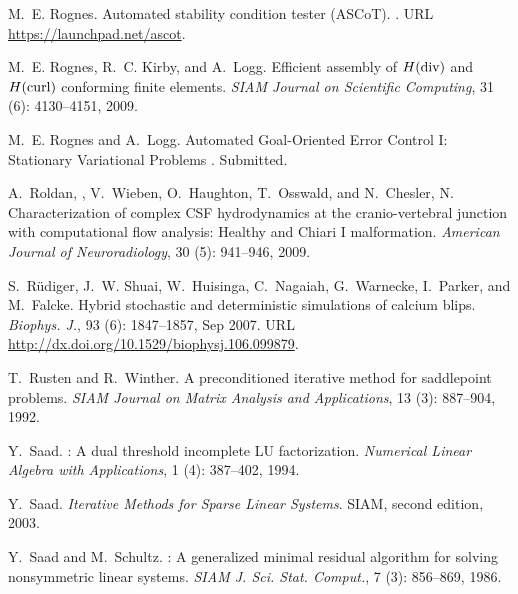 \begin{thebibliography}{467}
M.~E. Rognes.
\newblock Automated stability condition tester ({ASCoT}).
.
\newblock URL \url{https://launchpad.net/ascot}.

M.~E. Rognes, R.~C. Kirby, and A.~Logg.
\newblock Efficient assembly of {$H({\rm div})$} and {$H({\rm curl})$}
  conforming finite elements.
\newblock \emph{SIAM Journal on Scientific Computing}, 31
  (6): 4130--4151, 2009.

M.~E. Rognes and A.~Logg.
\newblock Automated Goal-Oriented Error Control {I}: Stationary Variational Problems
.
\newblock Submitted.

A.~Roldan, , V.~Wieben, O.~Haughton, T.~Osswald, and N.~Chesler, N.
\newblock Characterization of complex {CSF} hydrodynamics at the
  cranio-vertebral junction with computational flow analysis: {H}ealthy and
  {C}hiari {I} malformation.
\newblock \emph{American Journal of Neuroradiology}, 30 (5):
  941--946, 2009.

S.~R\"udiger, J.~W. Shuai, W.~Huisinga, C.~Nagaiah, G.~Warnecke, I.~Parker, and
  M.~Falcke.
\newblock Hybrid stochastic and deterministic simulations of calcium blips.
\newblock \emph{Biophys. J.}, 93 (6): 1847--1857, Sep 2007.
\newblock URL \url{http://dx.doi.org/10.1529/biophysj.106.099879}.

T.~Rusten and R.~Winther.
\newblock A preconditioned iterative method for saddlepoint problems.
\newblock \emph{SIAM Journal on Matrix Analysis and Applications}, 13
  (3): 887--904, 1992.

Y.~Saad.
: {A} dual threshold incomplete {LU} factorization.
\newblock \emph{Numerical Linear Algebra with Applications}, 1
  (4): 387--402, 1994.

Y.~Saad.
\newblock \emph{Iterative Methods for Sparse Linear Systems}.
\newblock SIAM, second edition, 2003.

Y.~Saad and M.~Schultz.
: A generalized minimal residual algorithm for solving
  nonsymmetric linear systems.
\newblock \emph{SIAM J. Sci. Stat. Comput.}, 7 (3): 856--869,
  1986.


\end{thebibliography}

